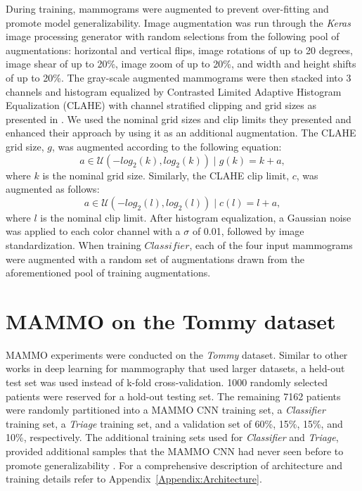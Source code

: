 \documentclass[journal]{IEEEtran}
\begin{document}
During training, mammograms were augmented to prevent over-fitting and promote model generalizability.  Image augmentation was run through the \textit{Keras} \cite{keras-2015} image processing generator with random selections from the following pool of augmentations: horizontal and vertical flips, image rotations of up to 20 degrees, image shear of up to 20\%, image zoom of up to 20\%, and width and height shifts of up to 20\%.  The gray-scale augmented mammograms were then stacked into 3 channels and histogram equalized by Contrasted Limited Adaptive Histogram Equalization (CLAHE) with channel stratified clipping and grid sizes as presented in \cite{teare-2017}.    We used the nominal grid sizes and clip limits they presented and enhanced their approach by using it as an additional augmentation. The CLAHE grid size, $g$,  was augmented according to the following equation:
\begin{equation} \label{eq:clahegrid}
a\in\mathcal{U}(-log_2(k), log_2(k)) \mid g(k) = k + a,
\end{equation}
where $k$ is the nominal grid size.  Similarly, the CLAHE clip limit, $c$, was augmented as follows:
\begin{equation} \label{eq:claheclip}
a\in\mathcal{U}(-log_2(l), log_2(l)) \mid c(l) = l + a,
\end{equation}
where $l$ is the nominal clip limit.  After histogram equalization, a Gaussian noise \cite{gaussian-2015} was applied to each color channel with a $\sigma$ of 0.01, followed by image standardization.  When training $\textit{Classifier}$, each of the four input mammograms were augmented with a random set of augmentations drawn from the aforementioned pool of training augmentations. 


\section{MAMMO on the Tommy dataset}

MAMMO experiments were conducted on the \textit{Tommy} dataset. Similar to other works in deep learning for mammography that used larger datasets, a held-out test set was used instead of k-fold cross-validation.  1000 randomly selected patients were reserved for a hold-out testing set.  The remaining 7162 patients were randomly partitioned into a MAMMO CNN training set, a \textit{Classifier} training set, a \textit{Triage} training set, and a validation set of 60\%, 15\%, 15\%, and 10\%, respectively.  The additional training sets used for \textit{Classifier} and \textit{Triage}, provided additional samples that the MAMMO CNN had never seen before to promote generalizability \cite{cascade-ensemble, stacked-ensemble}.  For a comprehensive description of architecture and training details refer to Appendix~\ref{Appendix:Architecture}. 
\end{document}
